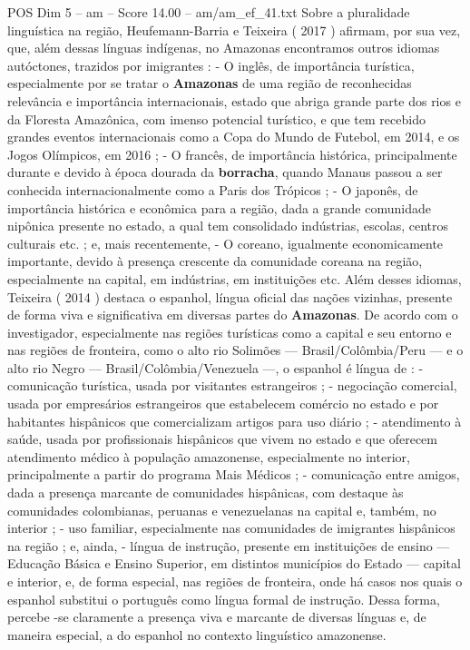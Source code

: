 \begin{textsample}{POS Dim 5 – am – Score 14.00 – am/am\_ef\_41.txt}
Sobre a pluralidade linguística na região, Heufemann-Barria e Teixeira ( 2017 ) afirmam, por sua vez, que, além dessas línguas indígenas, no Amazonas encontramos outros idiomas autóctones, trazidos por imigrantes : - O inglês, de importância turística, especialmente por se tratar o \textbf{Amazonas} de uma região de reconhecidas relevância e importância internacionais, estado que abriga grande parte dos rios e da Floresta Amazônica, com imenso potencial turístico, e que tem recebido grandes eventos internacionais como a Copa do Mundo de Futebol, em 2014, e os Jogos Olímpicos, em 2016 ; - O francês, de importância histórica, principalmente durante e devido à época dourada da \textbf{borracha}, quando Manaus passou a ser conhecida internacionalmente como a Paris dos Trópicos ; - O japonês, de importância histórica e econômica para a região, dada a grande comunidade nipônica presente no estado, a qual tem consolidado indústrias, escolas, centros culturais etc. ; e, mais recentemente, - O coreano, igualmente economicamente importante, devido à presença crescente da comunidade coreana na região, especialmente na capital, em indústrias, em instituições etc.
Além desses idiomas, Teixeira ( 2014 ) destaca o espanhol, língua oficial das nações vizinhas, presente de forma viva e significativa em diversas partes do \textbf{Amazonas}.
De acordo com o investigador, especialmente nas regiões turísticas como a capital e seu entorno e nas regiões de fronteira, como o alto rio Solimões — Brasil/Colômbia/Peru — e o alto rio Negro — Brasil/Colômbia/Venezuela —, o espanhol é língua de : - comunicação turística, usada por visitantes estrangeiros ; - negociação comercial, usada por empresários estrangeiros que estabelecem comércio no estado e por habitantes hispânicos que comercializam artigos para uso diário ; - atendimento à saúde, usada por profissionais hispânicos que vivem no estado e que oferecem atendimento médico à população amazonense, especialmente no interior, principalmente a partir do programa Mais Médicos ; - comunicação entre amigos, dada a presença marcante de comunidades hispânicas, com destaque às comunidades colombianas, peruanas e venezuelanas na capital e, também, no interior ; - uso familiar, especialmente nas comunidades de imigrantes hispânicos na região ; e, ainda, - língua de instrução, presente em instituições de ensino — Educação Básica e Ensino Superior, em distintos municípios do Estado — capital e interior, e, de forma especial, nas regiões de fronteira, onde há casos nos quais o espanhol substitui o português como língua formal de instrução.
Dessa forma, percebe -se claramente a presença viva e marcante de diversas línguas e, de maneira especial, a do espanhol no contexto linguístico amazonense.

\end{textsample}
